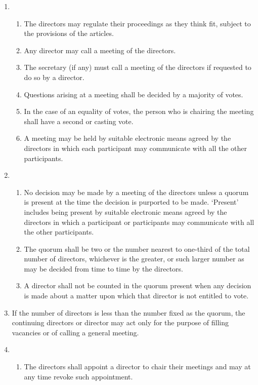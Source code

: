 \begin{enumerate}
\item
  \begin{enumerate}
  \item
    The directors may regulate their proceedings as they think fit,
    subject to the provisions of the articles.
  \item
    Any director may call a meeting of the directors.
  \item
    The secretary (if any) must call a meeting of the directors if
    requested to do so by a director.
  \item
    Questions arising at a meeting shall be decided by a majority of
    votes.
  \item
    In the case of an equality of votes, the person who is chairing the
    meeting shall have a second or casting vote.
  \item
    A meeting may be held by suitable electronic means agreed by the
    directors in which each participant may communicate with all the
    other participants.
  \end{enumerate}
\item
  \begin{enumerate}
  \item
    No decision may be made by a meeting of the directors unless a
    quorum is present at the time the decision is purported to be made.
    `Present' includes being present by suitable electronic means
    agreed by the directors in which a participant or participants may
    communicate with all the other participants.
  \item
    The quorum shall be two or the number nearest to one-third of the
    total number of directors, whichever is the greater, or such larger
    number as may be decided from time to time by the directors.
  \item
    A director shall not be counted in the quorum present when any
    decision is made about a matter upon which that director is not
    entitled to vote.
  \end{enumerate}
\item
  If the number of directors is less than the number fixed as the
  quorum, the continuing directors or director may act only for the
  purpose of filling vacancies or of calling a general meeting.
\item
  \begin{enumerate}
  \item
    The directors shall appoint a director to chair their meetings and
    may at any time revoke such appointment.

\end{enumerate}
\end{enumerate}
